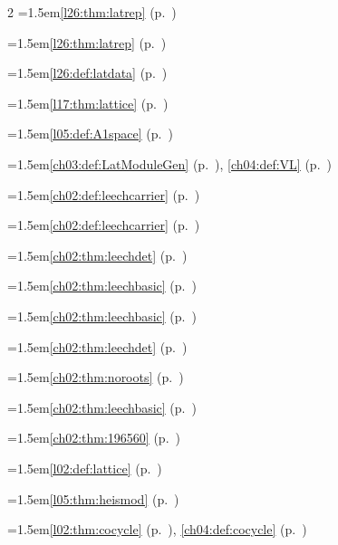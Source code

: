 \begin{multicols}{2}
\hangindent=1.5em\quad \ref{l26:thm:latrep} (p.~\pageref{l26:thm:latrep})\par
\hangindent=1.5em\quad \ref{l26:thm:latrep} (p.~\pageref{l26:thm:latrep})\par
\hangindent=1.5em\quad \ref{l26:def:latdata} (p.~\pageref{l26:def:latdata})\par
\hangindent=1.5em\quad \ref{l17:thm:lattice} (p.~\pageref{l17:thm:lattice})\par
\hangindent=1.5em\quad \ref{l05:def:A1space} (p.~\pageref{l05:def:A1space})\par
\hangindent=1.5em\quad \ref{ch03:def:LatModuleGen} (p.~\pageref{ch03:def:LatModuleGen}), \ref{ch04:def:VL} (p.~\pageref{ch04:def:VL})\par
\hangindent=1.5em\quad \ref{ch02:def:leechcarrier} (p.~\pageref{ch02:def:leechcarrier})\par
\hangindent=1.5em\quad \ref{ch02:def:leechcarrier} (p.~\pageref{ch02:def:leechcarrier})\par
\hangindent=1.5em\quad \ref{ch02:thm:leechdet} (p.~\pageref{ch02:thm:leechdet})\par
\hangindent=1.5em\quad \ref{ch02:thm:leechbasic} (p.~\pageref{ch02:thm:leechbasic})\par
\hangindent=1.5em\quad \ref{ch02:thm:leechbasic} (p.~\pageref{ch02:thm:leechbasic})\par
\hangindent=1.5em\quad \ref{ch02:thm:leechdet} (p.~\pageref{ch02:thm:leechdet})\par
\hangindent=1.5em\quad \ref{ch02:thm:noroots} (p.~\pageref{ch02:thm:noroots})\par
\hangindent=1.5em\quad \ref{ch02:thm:leechbasic} (p.~\pageref{ch02:thm:leechbasic})\par
\hangindent=1.5em\quad \ref{ch02:thm:196560} (p.~\pageref{ch02:thm:196560})\par
\hangindent=1.5em\quad \ref{l02:def:lattice} (p.~\pageref{l02:def:lattice})\par
\hangindent=1.5em\quad \ref{l05:thm:heismod} (p.~\pageref{l05:thm:heismod})\par
\hangindent=1.5em\quad \ref{l02:thm:cocycle} (p.~\pageref{l02:thm:cocycle}), \ref{ch04:def:cocycle} (p.~\pageref{ch04:def:cocycle})\par

\end{multicols}
